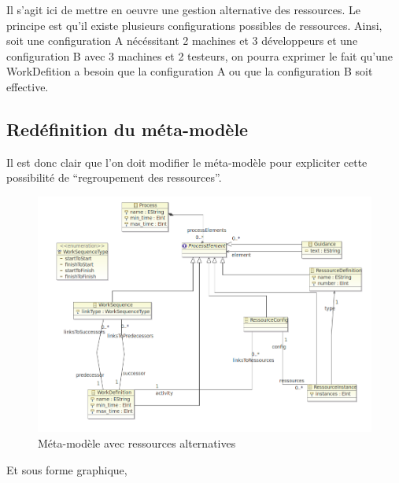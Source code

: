 Il s'agit ici de mettre en oeuvre une gestion alternative des ressources. Le principe est qu'il existe plusieurs configurations possibles de ressources.
Ainsi, soit une configuration A nécéssitant 2 machines et 3 développeurs et une configuration B avec 3 machines et 2 testeurs, on pourra exprimer le fait qu'une WorkDefition a besoin que la configuration A ou que la configuration B soit effective.

\subsection{Redéfinition du méta-modèle}

Il est donc clair que l'on doit modifier le méta-modèle pour expliciter cette possibilité de ``regroupement des ressources''.

\begin{figure}[!h] 
\begin{center}
\includegraphics[width=15cm]{Capture-13.png}
\caption{Méta-modèle avec ressources alternatives} 
\label{img1} 
\end{center}
\end{figure} 

Et sous forme graphique,\\

\newpage

